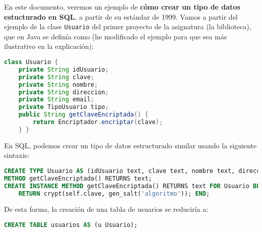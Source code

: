 \documentclass[12pt, a4paper]{article}
\title{\size{15pt}{Aplicación de tipos de datos estucturados en SQL} \vspace{-2ex}}
\date{\vspace{-5ex}}
\begin{document}
\maketitle
\thispagestyle{empty}

\vspace{-10ex}

En este documento, veremos un ejemplo de \textbf{cómo crear un tipo de datos estucturado en SQL}, a partir de su estándar de 1999. Vamos a partir del ejemplo de la clase \texttt{Usuario} del primer proyecto de la asignatura (la biblioteca), que en Java se definía como (he modificado el ejemplo para que sea más ilustrativo en la explicación):

\begin{center}
    \begin{minipage}[c]{0,7\textwidth}
\begin{lstlisting}[language=Java]
class Usuario {
    private String idUsuario;
    private String clave;
    private String nombre;
    private String direccion;
    private String email;
    private TipoUsuario tipo;
    public String getClaveEncriptada() {
        return Encriptador.encriptar(clave);
    } }
\end{lstlisting}
\end{minipage}
\end{center}

En SQL, podemos crear un tipo de datos estructurado similar usando la siguiente sintaxis:

\begin{center}
    \begin{minipage}[c]{0,7\textwidth}
\begin{lstlisting}[language=SQL]
CREATE TYPE Usuario AS (idUsuario text, clave text, nombre text, direccion text, email text, tipo TipoUsuario) FINAL
METHOD getClaveEncriptada() RETURNS text;
CREATE INSTANCE METHOD getClaveEncriptada() RETURNS text FOR Usuario BEGIN
    RETURN crypt(self.clave, gen_salt('algoritmo')); END;
\end{lstlisting}
    \end{minipage}
\end{center}

De esta forma, la creación de una tabla de usuarios se reduciría a:

\begin{center}
    \begin{minipage}[c]{0,7\textwidth}
\begin{lstlisting}[language=SQL]
CREATE TABLE usuarios AS (u Usuario);
\end{lstlisting}
    \end{minipage}
\end{center}
\end{document}
